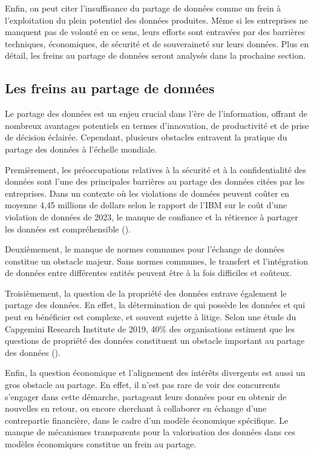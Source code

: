 Enfin, on peut citer l'insuffisance du partage de données comme un frein à l'exploitation du plein potentiel des données produites. Même si les entreprises ne manquent pas de volonté en ce sens, leurs efforts sont entravées par des barrières techniques, économiques, de sécurité et de souveraineté sur leurs données. Plus en détail, les freins au partage de données seront analysés dans la prochaine section.


\subsection{Les freins au partage de données} \label{subsec:freins_paratage}


Le partage des données est un enjeu crucial dans l'ère de l'information, offrant de nombreux avantages potentiels en termes d'innovation, de productivité et de prise de décision éclairée. Cependant, plusieurs obstacles entravent la pratique du partage des données à l'échelle mondiale.

Premièrement, les préoccupations relatives à la sécurité et à la confidentialité des données sont l'une des principales barrières au partage des données citées par les entreprises. Dans un contexte où les violations de données peuvent coûter en moyenne 4,45 millions de dollars selon le rapport de l'IBM sur le coût d'une violation de données de 2023, le manque de confiance et la réticence à partager les données est compréhensible (\cite{ibm_cost_2023}).

Deuxièmement, le manque de normes communes pour l'échange de données constitue un obstacle majeur. Sans normes communes, le transfert et l'intégration de données entre différentes entités peuvent être à la fois difficiles et coûteux.

Troisièmement, la question de la propriété des données entrave également le partage des données. En effet, la détermination de qui possède les données et qui peut en bénéficier est complexe, et souvent sujette à litige. Selon une étude du Capgemini Research Institute de 2019, 40\% des organisations estiment que les questions de propriété des données constituent un obstacle important au partage des données (\cite{capgemini_research_institute_data-powered_2019}).

Enfin, la question économique et l'alignement des intérêts divergents est aussi un gros obstacle au partage. En effet, il n'est pas rare de voir des concurrents s'engager dans cette démarche, partageant leurs données pour en obtenir de nouvelles en retour, ou encore cherchant à collaborer en échange d'une contrepartie financière, dans le cadre d'un modèle économique spécifique. Le manque de mécanismes transparents pour la valorisation des données dans ces modèles économiques constitue un frein au partage. 

